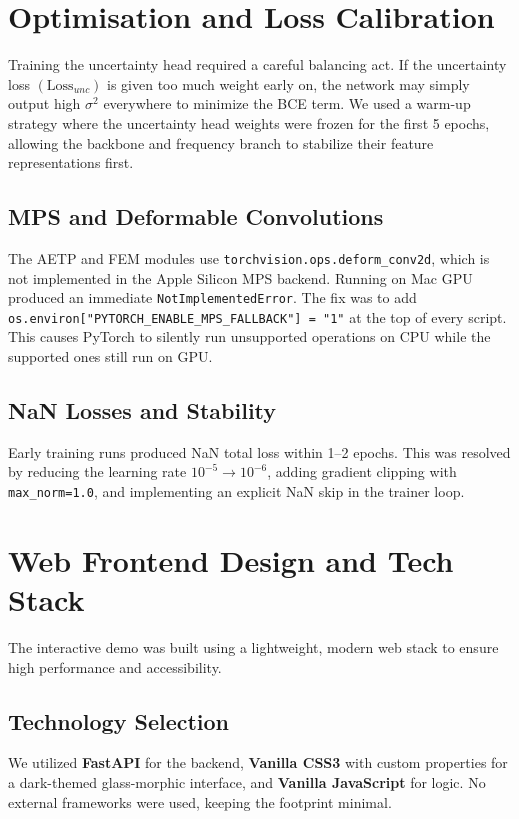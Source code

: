 \documentclass[12pt,a4paper]{report}
\begin{document}
\section{Optimisation and Loss Calibration}

Training the uncertainty head required a careful balancing act. If the uncertainty loss $(\text{Loss}_{unc})$ is given too much weight early on, the network may simply output high $\sigma^2$ everywhere to minimize the BCE term. We used a warm-up strategy where the uncertainty head weights were frozen for the first 5 epochs, allowing the backbone and frequency branch to stabilize their feature representations first.

\subsection{MPS and Deformable Convolutions}

The AETP and FEM modules use \texttt{torchvision.ops.deform\_conv2d}, which is not implemented in the Apple Silicon MPS backend. Running on Mac GPU produced an immediate \texttt{NotImplementedError}. The fix was to add \texttt{os.environ["PYTORCH\_ENABLE\_MPS\_FALLBACK"] = "1"} at the top of every script. This causes PyTorch to silently run unsupported operations on CPU while the supported ones still run on GPU.

\subsection{NaN Losses and Stability}

Early training runs produced NaN total loss within 1--2 epochs. This was resolved by reducing the learning rate $10^{-5} \to 10^{-6}$, adding gradient clipping with \texttt{max\_norm=1.0}, and implementing an explicit NaN skip in the trainer loop.

\section{Web Frontend Design and Tech Stack}

The interactive demo was built using a lightweight, modern web stack to ensure high performance and accessibility.

\subsection{Technology Selection}
We utilized \textbf{FastAPI} for the backend, \textbf{Vanilla CSS3} with custom properties for a dark-themed glass-morphic interface, and \textbf{Vanilla JavaScript} for logic. No external frameworks were used, keeping the footprint minimal.
\end{document}
